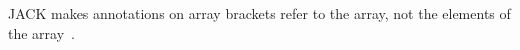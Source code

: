 \documentclass[10pt]{article}
\begin{document}
JACK makes annotations on array brackets refer to the array, not the
elements of the array~\cite{MalePPD2008}.



% 






% 
% 
% 
% 
% 
% 
% 
% 
% 
\end{document}
